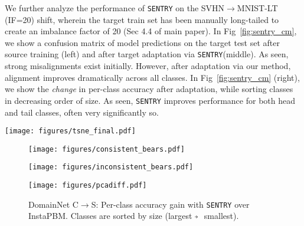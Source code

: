 \documentclass[10pt,twocolumn,letterpaper]{article}
\newcommand{\method}{\texttt{SENTRY}\xspace}
\newcommand{\veryshortarrow}[1][3pt]{\mathrel{\hbox{\rule[\dimexpr\fontdimen22\textfont2-.2pt\relax]{#1}{.4pt}}\mkern-4mu\hbox{\usefont{U}{lasy}{m}{n}\symbol{41}}}}
\begin{document}
We further analyze the performance of \method on the SVHN$\rightarrow$MNIST-LT (IF=20) shift, wherein the target train set has been manually long-tailed to create an imbalance factor of 20 (Sec 4.4 of main paper). In Fig~\ref{fig:sentry_cm}, we show a confusion matrix of model predictions on the target test set after source training (left) and after target adaptation via \method (middle). As seen, strong misalignments exist initially. However, after adaptation via our method, alignment improves dramatically across all classes. In Fig~\ref{fig:sentry_cm} (right), we show the \emph{change} in per-class accuracy after adaptation, while sorting classes in decreasing order of size. As seen, \method improves performance for both head and tail classes, often very significantly so.

 
\begin{figure*}[t]
    \centering
    \texttt{[image: figures/tsne\_final.pdf]}
    \caption[]{SVHN$\rightarrow$MNIST: We use t-SNE~\cite{maaten2008visualizing} to visualize features for incorrect (large, opaque circles) and correct (partly transparent circles) model predictions on the imbalanced target train set and source train set before (left) and after (right) adaptation via \method. Colors denote ground truth class, and $\times$ and $\bigcirc$ denote source and target instances. \method is able to overcome significant misalignments for both head classes with many examples ('s and 2's) as well as tail classes with very few examples ('s and 9's).}
    \label{fig:tsne}
\end{figure*}

\begin{figure*}[b]
    \centering
    \begin{subfigure}[b]{0.3\textwidth}  
        \centering 
        \texttt{[image: figures/consistent\_bears.pdf]}
        \caption[]{{}}   
        \label{fig:consistent_bears}
    \end{subfigure}
    \begin{subfigure}[b]{0.3\textwidth}
        \centering
        \texttt{[image: figures/inconsistent\_bears.pdf]}
        \caption[]{{}}
        \label{fig:inconsistent_bears}
    \end{subfigure}
    \caption[]
    {DomainNet Clipart$\rightarrow$Sketch: Visualizing most consistent and inconsistent target instances.}
    \label{fig:qualitative_examples}
\end{figure*}


\begin{figure}[H]
    \centering
    \texttt{[image: figures/pcadiff.pdf]}
    \caption{{\small
    DomainNet C$\rightarrow$S: Per-class accuracy gain with \method over InstaPBM. Classes are sorted by size (largest $\veryshortarrow{}$ smallest). }}
    \label{fig:pcadiff}
    \vspace{-10pt}
 \end{figure}
\end{document}
